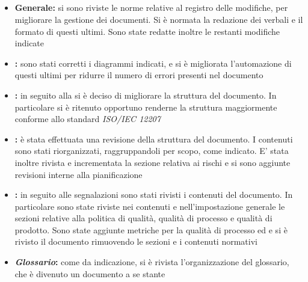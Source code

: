 \documentclass[12pt,a4paper]{article}
\begin{document}
\subsection{\RR}
\begin{itemize}
	\item \textbf{Generale:} si sono riviste le norme relative al registro delle modifiche, per migliorare la gestione dei documenti. Si è normata la redazione dei verbali e il formato di questi ultimi. Sono state redatte inoltre le restanti modifiche indicate
	\item \textbf{\AdR{}:} sono stati corretti i diagrammi indicati, e si è migliorata l'automazione di questi ultimi per ridurre il numero di errori presenti nel documento
	\item \textbf{\NdP{}:} in seguito alla \RR{} si è deciso di migliorare la struttura del documento. In particolare si è ritenuto opportuno renderne la struttura maggiormente conforme allo standard \textit{ISO/IEC 12207}
	\item \textbf{\PdP{}:} è stata effettuata una revisione della struttura del documento. I contenuti sono stati riorganizzati, raggruppandoli per scopo, come indicato. E' stata inoltre rivista e incrementata la sezione relativa ai rischi e si sono aggiunte revisioni interne alla pianificazione
	\item \textbf{\PdQ{}:} in seguito alle segnalazioni sono stati rivisti i contenuti del documento. In particolare sono state riviste nei contenuti e nell'impostazione generale le sezioni relative alla politica di qualità, qualità di processo e qualità di prodotto. Sono state aggiunte metriche per la qualità di processo ed e si è rivisto il documento rimuovendo le sezioni e i contenuti normativi
	\item \textbf{\textit{Glossario}:} come da indicazione, si è rivista l'organizzazione del glossario, che è divenuto un documento a se stante
\end{itemize}
\end{document}
